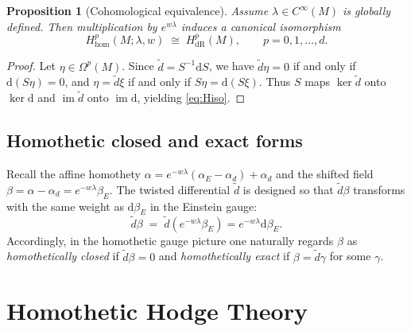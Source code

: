 \documentclass[preprint,12pt]{elsarticle}
\theoremstyle{plain}
\newtheorem{proposition}[theorem]{Proposition}
\theoremstyle{definition}
\theoremstyle{note}
\newcommand{\dR}{\mathrm{dR}}
\newcommand{\dd}{\mathrm{d}}
\newcommand{\wtd}{\tilde d}
\begin{document}
\begin{proposition}[Cohomological equivalence]\label{prop:cohom-equivalence}
Assume $\lambda\in C^\infty(M)$ is globally defined. Then multiplication by $e^{w\lambda}$ induces a canonical isomorphism
\begin{equation}\label{eq:Hiso}
H^p_{\mathrm{hom}}(M;\lambda,w)\;\cong\; H^p_{\dR}(M),
\qquad p=0,1,\dots,d.
\end{equation}
\end{proposition}

\begin{proof}
Let $\eta\in\Omega^p(M)$. Since $\wtd=S^{-1}\dd S$, we have $\wtd\eta=0$ if and only if $\dd(S\eta)=0$, and $\eta=\wtd\xi$ if and only if $S\eta=\dd(S\xi)$.
Thus $S$ maps $\ker\wtd$ onto $\ker\dd$ and $\operatorname{im}\wtd$ onto $\operatorname{im}\dd$, yielding \eqref{eq:Hiso}.
\end{proof}

\subsection{Homothetic closed and exact forms}
Recall the affine homothety $\alpha=e^{-w\lambda}(\alpha_E-\alpha_d)+\alpha_d$ and the shifted field $\beta=\alpha-\alpha_d=e^{-w\lambda}\beta_E$. The twisted differential $\wtd$ is designed so that $\wtd \beta$ transforms with the same weight as $\dd\beta_E$ in the Einstein gauge:
\begin{equation}\label{eq:intertwine-again}
\wtd \beta \;=\; \wtd\!\left(e^{-w\lambda}\beta_E\right)=e^{-w\lambda}\dd\beta_E. 
\end{equation}
Accordingly, in the homothetic gauge picture one naturally regards $\beta$ as \emph{homothetically closed} if $\wtd \beta=0$ and \emph{homothetically exact} if $\beta=\wtd \gamma$ for some $\gamma$.

\section{Homothetic Hodge Theory} \label{sec:homothetic-hodge}
\end{document}
